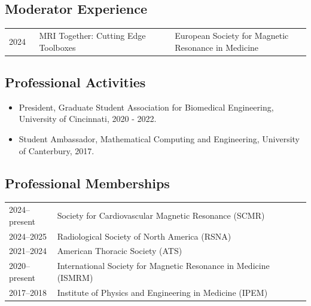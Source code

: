 \documentclass[12pt,]{scrartcl}
\begin{document}
\subsection{Moderator Experience}\label{moderator}

\begin{table}[!h]
{\def\arraystretch{1.5}\tabcolsep=0pt
\begin{tabular}{p{0.10\linewidth}p{0.45\linewidth}p{0.45\linewidth}}

2024 & MRI Together: Cutting Edge Toolboxes & European Society for Magnetic Resonance in Medicine \\

\end{tabular}%
}
\end{table}



\subsection{Professional Activities}\label{professional-activities}

\begin{itemize}
  \leftskip-0.25in
  \item President, Graduate Student Association for Biomedical Engineering, University of Cincinnati, 2020 - 2022.
  \item Student Ambassador, Mathematical Computing and Engineering, University of Canterbury, 2017.

\end{itemize}

\subsection{Professional Memberships}\label{professional-memberships}

\begin{table}[h!]
{\def\arraystretch{1.4}\tabcolsep=0pt
\begin{tabular}{p{0.16\linewidth}p{0.84\linewidth}}

  2024--present & Society for Cardiovascular Magnetic Resonance (SCMR) \\

  2024--2025 & Radiological Society of North America (RSNA) \\
  
  2021--2024 & American Thoracic Society (ATS) \\
  
  2020--present & International Society for Magnetic Resonance in Medicine (ISMRM) \\
  
  2017--2018 & Institute of Physics and Engineering in Medicine (IPEM) \\

\end{tabular}%
}
\end{table}
\end{document}
